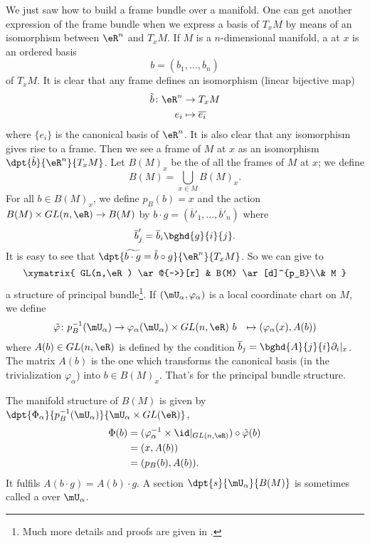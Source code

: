 We just saw how to build a frame bundle over a manifold. One can get another expression of the frame bundle when we express a basis of $T_xM$ by means of an isomorphism between $\eR^n$ and $T_xM$. If $M$ is a $n$-dimensional manifold, a  at $x$ is an ordered basis  
\[
   b=(\overline{ b }_1,\ldots,\overline{ b }_n)
\]
of $T_xM$. It is clear that any frame defines an isomorphism (linear bijective map)
\begin{equation}
\begin{aligned}
	\tilde{b}\colon\eR^n&\to T_xM \\ 
    e_i&\mapsto \overline{ e_i }
\end{aligned}
\end{equation}
where $\{e_i\}$ is the canonical basis of $\eR^n$. It is also clear that any isomorphism gives rise to a frame. Then we see a frame of $M$ at $x$ as an isomorphism $\dpt{\tilde{b}}{\eR^n}{T_xM}$. Let $B(M)_x$ be the of all the frames of $M$ at $x$; we define
\[
   B(M)=\bigcup_{x\in M}B(M)_x.
\]
For all $b\in B(M)_x$, we define $p_B(b)=x$ and the action $B(M)\times GL(n,\eR)\to B(M)$ by $b\cdot g=(\overline{ b }'_1,\ldots,\overline{ b }'_n)$ where
\begin{equation}
  \overline{ b }'_j=\overline{ b }_i\bghd{g}{i}{j}.
\end{equation}
It is easy to see that $\dpt{\widetilde{b\cdot g}=\tilde{b}\circ g}{\eR^n}{T_xM}$. So we can give to
\begin{equation}
\xymatrix{
    GL(n,\eR)  \ar@{~>}[r] & B(M) \ar[d]^{p_B}\\& M
  }
\end{equation}
a structure of principal bundle\footnote{Much more details and proofs are given in \cite{Naber}.}. If $(\mU_{\alpha},\varphi_{\alpha})$ is a local coordinate chart on $M$, we define
		\begin{equation}
		\begin{aligned}
			\tilde{\varphi} \colon p_B^{-1}(\mU_{\alpha}) &\to \varphi_{\alpha}(\mU_{\alpha})\times GL(n,\eR)\
			b&\mapsto (\varphi_{\alpha}(x),A(b))
		\end{aligned}
	\end{equation}	
where $A(b)\in GL(n,\eR)$ is defined by the condition $\overline{ b }_j=\bghd{A}{j}{i}\partial_i|_x$. The matrix $A(b)$ is the one which transforms the canonical basis (in the trivialization $\varphi_{\alpha}$) into $b\in B(M)_x$. That's for the principal bundle structure. 

The manifold structure of $B(M)$ is given by $\dpt{\Phi_{\alpha}}{p_B^{-1}(\mU_{\alpha})}{\mU_{\alpha}\times GL(\eR)}$,
\begin{equation}
\begin{split}
  \Phi(b)&=(\varphi_{\alpha}^{-1}\times \id|_{GL(n,\eR)})\circ\tilde{\varphi}(b)\\
         &=(x,A(b))\\
         &=(p_B(b),A(b)).
\end{split}
\end{equation}
It fulfils $A(b\cdot g)=A(b)\cdot g$. A section $\dpt{s}{\mU_{\alpha}}{B(M)}$ is sometimes called a  over $\mU_{\alpha}$.

